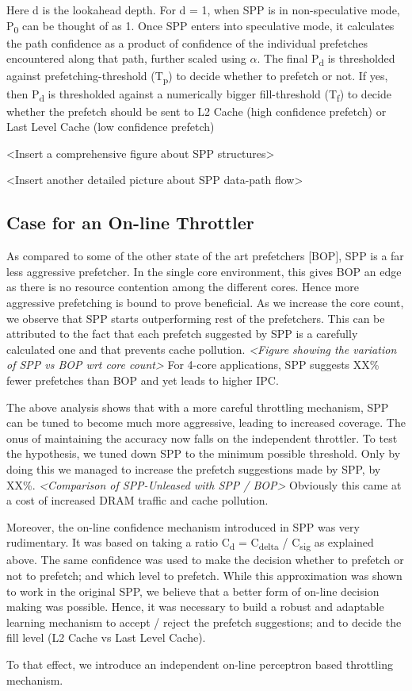 Here d is the lookahead depth.  For d = 1, when SPP is in
non-speculative mode, P\textsubscript{0} can be thought of as 1.  Once
SPP enters into speculative mode, it calculates the path confidence as
a product of confidence of the individual prefetches encountered along
that path, further scaled using $\alpha$.  The final
P\textsubscript{d} is thresholded against prefetching-threshold
(T\textsubscript{p}) to decide whether to prefetch or not.  If yes,
then P\textsubscript{d} is thresholded against a numerically bigger
fill-threshold (T\textsubscript{f}) to decide whether the prefetch
should be sent to L2 Cache (high confidence prefetch) or Last Level
Cache (low confidence prefetch)

<Insert a comprehensive figure about SPP structures>

<Insert another detailed picture about SPP data-path flow>

\subsection{Case for an On-line Throttler}
As compared to some of the other state of the art prefetchers [BOP],
SPP is a far less aggressive prefetcher.  In the single core
environment, this gives BOP an edge as there is no resource contention
among the different cores.  Hence more aggressive prefetching is bound
to prove beneficial.  As we increase the core count, we observe that
SPP starts outperforming rest of the prefetchers.  This can be
attributed to the fact that each prefetch suggested by SPP is a
carefully calculated one and that prevents cache pollution.
\textit{<Figure showing the variation of SPP vs BOP wrt core count>}
For 4-core applications, SPP suggests XX\% fewer prefetches than BOP
and yet leads to higher IPC.

The above analysis shows that with a more careful throttling
mechanism, SPP can be tuned to become much more aggressive, leading to
increased coverage.  The onus of maintaining the accuracy now falls on
the independent throttler.  To test the hypothesis, we tuned down SPP
to the minimum possible threshold.  Only by doing this we managed to
increase the prefetch suggestions made by SPP, by XX\%.
\textit{<Comparison of SPP-Unleased with SPP / BOP>} Obviously this
came at a cost of increased DRAM traffic and cache pollution.

Moreover, the on-line confidence mechanism introduced in SPP was very
rudimentary.  It was based on taking a ratio C\textsubscript{d} =
C\textsubscript{delta} / C\textsubscript{sig} as explained above.  The
same confidence was used to make the decision whether to prefetch or
not to prefetch; and which level to prefetch.  While this
approximation was shown to work in the original SPP, we believe that a
better form of on-line decision making was possible.  Hence, it was
necessary to build a robust and adaptable learning mechanism to accept
/ reject the prefetch suggestions; and to decide the fill level (L2
Cache vs Last Level Cache).

To that effect, we introduce an independent on-line perceptron based throttling mechanism.
